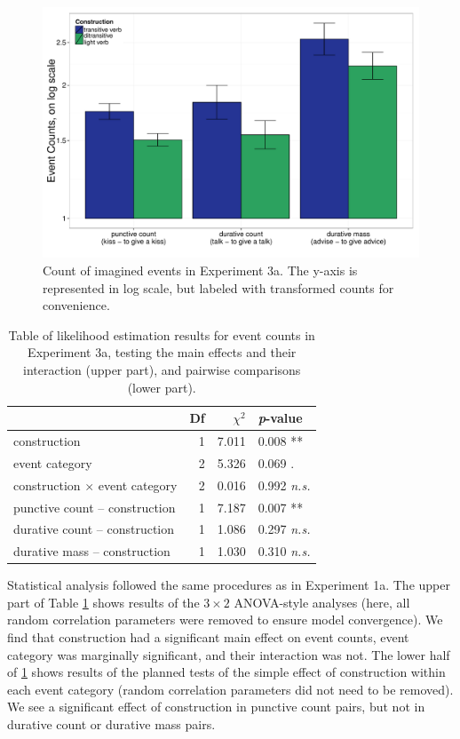 \documentclass[preprint,12pt,authoryear]{elsarticle}
\begin{document}
\begin{figure}
\centering
\includegraphics[width=\textwidth]{./Figures/Exp3a_EventCountsBar.pdf}
\caption{Count of imagined events in Experiment 3a. The y-axis is represented in log scale, but labeled with transformed counts  for convenience.  }
\label{fig_resCount}
\end{figure}



\begin{table}[ht]
\centering
\begin{tabular}{lrrl}
  \hline
 & Df &  $\chi^2$ & \emph{p}-value \\ 
  \hline
construction          & 1 &  7.011 & 0.008 ** \\ 
  event category          & 2 &  5.326 & 0.069 .\\ 
  construction $\times$ event category & 2 & 0.016 & 0.992 \emph{n.s.} \\    \hline
   punctive count -- construction    & 1 & 7.187 & 0.007 ** \\    
   durative count -- construction    & 1  & 1.086 & 0.297 \emph{n.s.}\\ 
   durative mass -- construction   & 1 &  1.030 & 0.310 \emph{n.s.}\\ \hline
\end{tabular}
\caption{Table of likelihood estimation results for event counts in Experiment 3a, testing the main effects and their interaction (upper part), and pairwise comparisons (lower part).}
\label{tab_countsregr3}
\end{table}

Statistical analysis followed the same procedures as in Experiment 1a.  The upper part of Table \ref{tab_countsregr3} shows results of the $3 \times 2$ ANOVA-style analyses (here, all random correlation parameters were removed to ensure model convergence).  We find that construction had a significant main effect on event counts, event category was marginally significant, and their interaction was not.  The lower half of  \ref{tab_countsregr3} shows results of the planned tests of the simple effect of construction within each event category (random correlation parameters did not need to be removed).  We see a significant effect of construction in punctive count pairs, but not in durative count or durative mass pairs.
\end{document}
